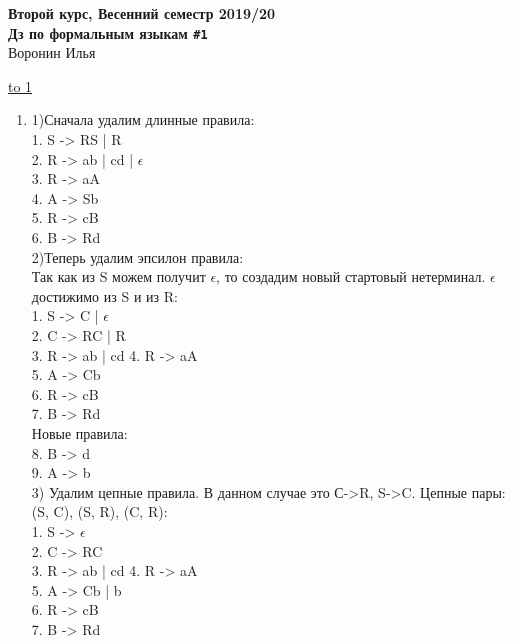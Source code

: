 \documentclass[12pt]{article}
\def\WHOAMI{Воронин Илья}
\def\CURNO{\NO\t{1}}
\def\t{\texttt}               %
\def\NO{\t{\#}}               %
\def\LINE{\vspace*{-1em}\noindent \underline{\hbox to 1\textwidth{{ } \hfil{ } \hfil{ } }}}
\begin{document}
\renewcommand{\dateseparator}{--}
\begin{center}
  {\Large\bf 
   Второй курс, Весенний семестр 2019/20\\
   Дз по формальным языкам \CURNO\\
   \vspace*{0.5em} 
   }
  \vspace{0.5em}
  {\WHOAMI}
\end{center}

\vspace{-1em}
\LINE
\vspace{1em}


\pagestyle{fancy}


\begin{enumerate}
	    \item [\bf \textnumero 2]
	    1)Сначала удалим длинные правила:\\
	      1. S -> RS | R\\
	      2. R -> ab | cd | $\epsilon$\\
	      3. R -> aA\\
	      4. A -> Sb\\
	      5. R -> cB\\
	      6. B -> Rd\\
	    2)Теперь удалим эпсилон правила:\\
	       Так как из S можем получит $\epsilon$, то создадим новый стартовый нетерминал. $\epsilon$ достижимо из S и из R:\\
	        1. S -> C | $\epsilon$\\
	        2. C -> RC | R\\
			3. R -> ab | cd
			4. R -> aA\\
			5. A -> Cb\\
			6. R -> cB\\
			7. B -> Rd\\
			Новые правила:\\
			8. B -> d\\
			9. A -> b\\
	     3) Удалим цепные правила. В данном случае это С->R, S->C.  Цепные пары: (S, C), (S, R), (C, R):\\
	     	 1. S -> $\epsilon$\\
		     2. C -> RC\\
		     3. R -> ab | cd
		     4. R -> aA\\
		     5. A -> Cb | b\\
		     6. R -> cB\\
		     7. B -> Rd\\

\end{enumerate}
\end{document}
